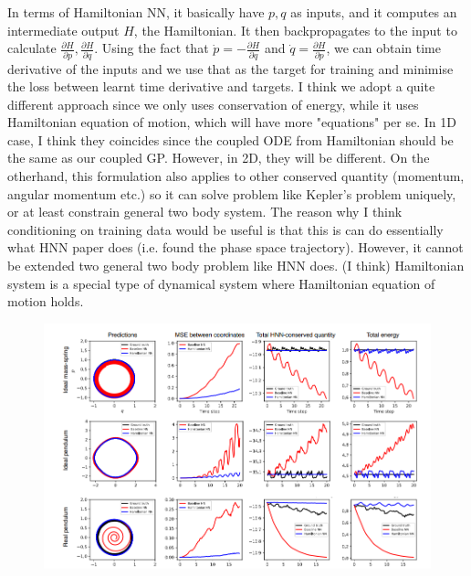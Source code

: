 \documentclass{article}
\begin{document}
In terms of Hamiltonian NN, it basically have $p, q$ as inputs, and it computes an intermediate output $H$, the Hamiltonian. 
It then backpropagates to the input to calculate $\frac{\partial H}{\partial p}, \frac{\partial H}{\partial q}$.
Using the fact that $\dot{p} = -\frac{\partial H}{\partial q}$ and $\dot{q} = \frac{\partial H}{\partial p}$, we can obtain time derivative of the inputs and we use that as the target for training and minimise the loss between learnt time derivative and targets.
I think we adopt a quite different approach since we only uses conservation of energy, while it uses Hamiltonian equation of motion, which will have more "equations" per se. 
In 1D case, I think they coincides since the coupled ODE from Hamiltonian should be the same as our coupled GP.
However, in 2D, they will be different.
On the otherhand, this formulation also applies to other conserved quantity (momentum, angular momentum etc.) so it can solve problem like Kepler's problem uniquely, or at least constrain general two body system.  
The reason why I think conditioning on training data would be useful is that this is can do essentially what HNN paper does (i.e. found the phase space trajectory).
However, it cannot be extended two general two body problem like HNN does. (I think)
Hamiltonian system is a special type of dynamical system where Hamiltonian equation of motion holds.


\begin{figure}[H]
  \includegraphics[width=\linewidth]{pendulum.png}
  \centering
\end{figure}
\end{document}
